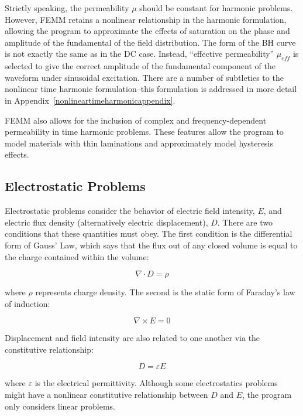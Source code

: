 \documentclass[12pt]{report}
\begin{document}
Strictly speaking, the permeability $\mu$ should be constant for
harmonic problems. However, FEMM retains a nonlinear relationship
in the harmonic formulation, allowing the program to approximate
the effects of saturation on the phase and amplitude of the
fundamental of the field distribution. The form of the BH curve is
not exactly the same as in the DC case. Instead, ``effective
permeability'' $\mu_{eff}$ is selected to give the correct
amplitude of the fundamental component of the waveform under
sinusoidal excitation. There are a number of subtleties to the
nonlinear time harmonic formulation--this formulation is addressed
in more detail in Appendix~\ref{nonlineartimeharmonicappendix}.

FEMM also allows for the inclusion of complex and frequency-dependent permeability in time harmonic problems.
These features allow the program to model materials with thin laminations and approximately model hysteresis
effects.

\subsection{Electrostatic Problems}

Electrostatic problems consider the behavior of electric field
intensity, $E$, and electric flux density (alternatively electric
displacement), $D$. There are two conditions that these quantities
must obey. The first condition is the differential form of Gauss'
Law, which says that the flux out of any closed volume is equal to
the charge contained within the volume:

\begin{equation}
\label{eq1}
\nabla \cdot D = \rho
\end{equation}

\noindent
where \textit{$\rho $} represents charge density. The second is the
static form of Faraday's law of induction:

\begin{equation}
\label{eq2}
\nabla \times E = 0
\end{equation}

\noindent
Displacement and field intensity are also related to one another via the
constitutive relationship:

\begin{equation}
\label{eq3}
D = \varepsilon E
\end{equation}

\noindent
where \textit{$\varepsilon $} is the electrical permittivity. Although some electrostatics problems
might have a nonlinear constitutive relationship between $D$ and $E$, the program only
considers linear problems.
\end{document}
